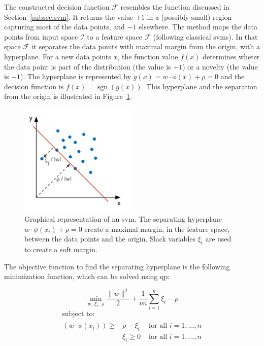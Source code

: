 The constructed decision function $\mathcal{F}$ resembles the function discussed in Section~\ref{subsec:svm}.
It returns the value $+1$ in a (possibly small) region capturing most of the data points, and $-1$ elsewhere.
The method maps the data points from input space $\mathcal{I}$ to a feature space $\mathcal{F}$ (following classical \glspl{svm}).
In that space $\mathcal{F}$ it separates the data points with maximal margin from the origin, with a hyperplane.
For a new data points $x$, the function value $f(x)$ determines wheter the data point is part of the distribution (\ie the value is $+1$) or a novelty (\ie the value is $-1$).
The hyperplane is represented by $g(x) = w \cdot \phi(x) + \rho = 0$ and the decision function is $f(x) = \operatorname{sgn}(g(x))$.
This hyperplane and the separation from the origin is illustrated in Figure~\ref{fig:nu-svm}.

\begin{figure}
  \centering
    \includegraphics[width=0.5\textwidth,keepaspectratio]{./Figures/chapter3/nu-svm.pdf}
  \caption[\gls{nu-svm}]{Graphical representation of \gls{nu-svm}. The separating hyperplane $w \cdot \phi(x_i) + \rho = 0$ create a maximal margin, in the feature space, between the data points and the origin. Slack variables $\xi_i$ are used to create a soft margin.}
  \label{fig:nu-svm}
\end{figure}

The objective function to find the separating hyperplane is the following minimization function, which can be solved using \gls{qp}:

\begin{equation}\label{eq:nu-svm_objective}
  \operatorname*{min}_{w,\ \xi_i,\ \rho } \frac{\lVert w \rVert ^2}{2} + \frac{1}{\nu n} \sum_{i=1}^n \xi_i - \rho
\end{equation}
\begin{equation}
  \begin{multlined}
    \mbox{ subject to: } \\
    \begin{aligned}
      (w \cdot \phi(x_i)) \geq & \rho - \xi_i & \mbox{ for all } i = 1, \dots, n \\
      & \xi_i \geq 0 & \mbox{ for all } i = 1, \dots, n \\
    \end{aligned}
  \end{multlined}
\end{equation}


